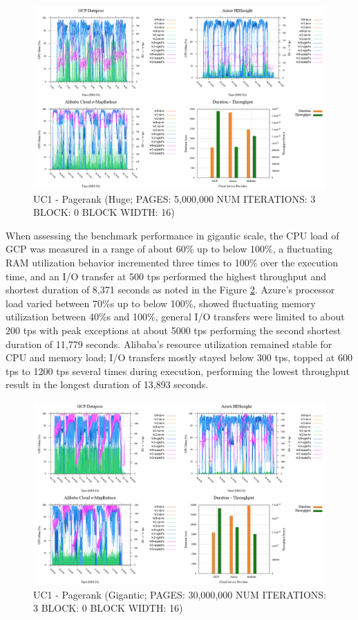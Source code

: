 \documentclass[review]{elsarticle}
\begin{document}
\begin{figure}[p]
	\caption{UC1 - Pagerank (Huge; PAGES: 5,000,000 NUM ITERATIONS: 3 BLOCK: 0 BLOCK WIDTH: 16)}
	\label{fig:uc1-page-h-cmidt}
	\includegraphics[width=\textwidth]{uc1-page-h-cmidt}
	\centering
\end{figure}

When assessing the benchmark performance in gigantic scale, the CPU load of GCP was measured in a range of about 60\% up to below 100\%, a fluctuating RAM utilization behavior incremented three times to 100\% over the execution time, and an I/O transfer at 500 tps performed the highest throughput and shortest duration of 8,371 seconds as noted in the Figure \ref{fig:uc1-page-g-cmidt}. Azure's processor load varied between 70\%s up to below 100\%, showed fluctuating memory utilization between 40\%s and 100\%, general I/O transfers were limited to about 200 tps with peak exceptions at about 5000 tps performing the second shortest duration of 11,779 seconds. Alibaba's resource utilization remained stable for CPU and memory load; I/O transfers mostly stayed below 300 tps, topped at 600 tps to 1200 tps several times during execution, performing the lowest throughput result in the longest duration of 13,893 seconds.

\begin{figure}[p]
	\caption{UC1 - Pagerank (Gigantic; PAGES: 30,000,000 NUM ITERATIONS: 3 BLOCK: 0 BLOCK WIDTH: 16)}
	\label{fig:uc1-page-g-cmidt}
	\includegraphics[width=\textwidth]{uc1-page-g-cmidt}
	\centering
\end{figure}
\end{document}

